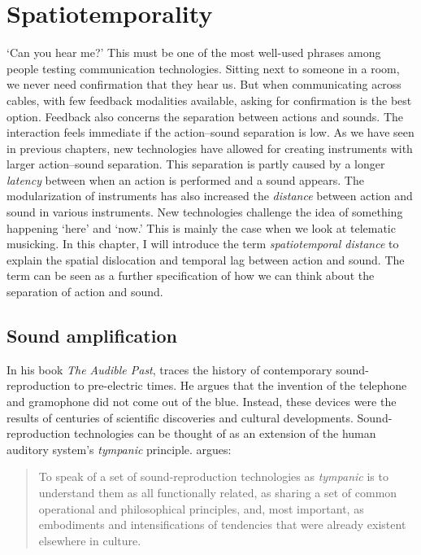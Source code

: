 \chapter{Spatiotemporality}\label{chap:hybrid}

`Can you hear me?' This must be one of the most well-used phrases among people testing communication technologies. Sitting next to someone in a room, we never need confirmation that they hear us. But when communicating across cables, with few feedback modalities available, asking for confirmation is the best option. Feedback also concerns the separation between actions and sounds. The interaction feels immediate if the action--sound separation is low. As we have seen in previous chapters, new technologies have allowed for creating instruments with larger action--sound separation. This separation is partly caused by a longer \emph{latency} between when an action is performed and a sound appears. The modularization of instruments has also increased the \emph{distance} between action and sound in various instruments. New technologies challenge the idea of something happening `here' and `now.' This is mainly the case when we look at telematic musicking. In this chapter, I will introduce the term \emph{spatiotemporal distance} to explain the spatial dislocation and temporal lag between action and sound. The term can be seen as a further specification of how we can think about the separation of action and sound.


\section{Sound amplification}

In his book \emph{The Audible Past}, \citet{sterne_audible_2003} traces the history of contemporary sound-reproduction to pre-electric times. He argues that the invention of the telephone and gramophone did not come out of the blue. Instead, these devices were the results of centuries of scientific discoveries and cultural developments. Sound-reproduction technologies can be thought of as an extension of the human auditory system's \emph{tympanic} principle. \citep[p.34]{sterne_audible_2003} argues:

\begin{quote}
To speak of a set of sound-reproduction technologies as \emph{tympanic} is to understand them as all functionally related, as sharing a set of common operational and philosophical principles, and, most important, as embodiments and intensifications of tendencies that were already existent elsewhere in culture.
\end{quote}

